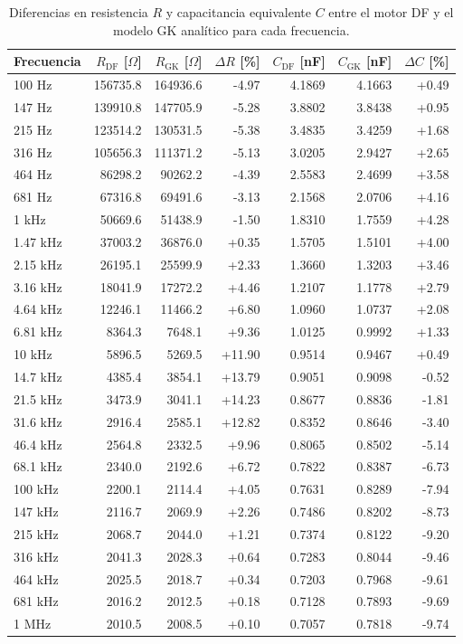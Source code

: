 \begin{table}[ht]
\centering
\caption{Diferencias en resistencia $R$ y capacitancia equivalente $C$ entre el motor DF y el modelo GK analítico para cada frecuencia.}
\label{tab:diff_RC}
\small
\begin{tabular}{lrrrrrr}
\toprule
Frecuencia & $R_{\mathrm{DF}}$ [$\Omega$] & $R_{\mathrm{GK}}$ [$\Omega$] & $\Delta R$ [\%] & $C_{\mathrm{DF}}$ [nF] & $C_{\mathrm{GK}}$ [nF] & $\Delta C$ [\%] \\
\midrule
100 Hz     & 156735.8 & 164936.6 & -4.97 & 4.1869 & 4.1663 & +0.49 \\
147 Hz     & 139910.8 & 147705.9 & -5.28 & 3.8802 & 3.8438 & +0.95 \\
215 Hz     & 123514.2 & 130531.5 & -5.38 & 3.4835 & 3.4259 & +1.68 \\
316 Hz     & 105656.3 & 111371.2 & -5.13 & 3.0205 & 2.9427 & +2.65 \\
464 Hz     & 86298.2 & 90262.2 & -4.39 & 2.5583 & 2.4699 & +3.58 \\
681 Hz     & 67316.8 & 69491.6 & -3.13 & 2.1568 & 2.0706 & +4.16 \\
1 kHz      & 50669.6 & 51438.9 & -1.50 & 1.8310 & 1.7559 & +4.28 \\
1.47 kHz   & 37003.2 & 36876.0 & +0.35 & 1.5705 & 1.5101 & +4.00 \\
2.15 kHz   & 26195.1 & 25599.9 & +2.33 & 1.3660 & 1.3203 & +3.46 \\
3.16 kHz   & 18041.9 & 17272.2 & +4.46 & 1.2107 & 1.1778 & +2.79 \\
4.64 kHz   & 12246.1 & 11466.2 & +6.80 & 1.0960 & 1.0737 & +2.08 \\
6.81 kHz   & 8364.3 & 7648.1 & +9.36 & 1.0125 & 0.9992 & +1.33 \\
10 kHz     & 5896.5 & 5269.5 & +11.90 & 0.9514 & 0.9467 & +0.49 \\
14.7 kHz   & 4385.4 & 3854.1 & +13.79 & 0.9051 & 0.9098 & -0.52 \\
21.5 kHz   & 3473.9 & 3041.1 & +14.23 & 0.8677 & 0.8836 & -1.81 \\
31.6 kHz   & 2916.4 & 2585.1 & +12.82 & 0.8352 & 0.8646 & -3.40 \\
46.4 kHz   & 2564.8 & 2332.5 & +9.96 & 0.8065 & 0.8502 & -5.14 \\
68.1 kHz   & 2340.0 & 2192.6 & +6.72 & 0.7822 & 0.8387 & -6.73 \\
100 kHz    & 2200.1 & 2114.4 & +4.05 & 0.7631 & 0.8289 & -7.94 \\
147 kHz    & 2116.7 & 2069.9 & +2.26 & 0.7486 & 0.8202 & -8.73 \\
215 kHz    & 2068.7 & 2044.0 & +1.21 & 0.7374 & 0.8122 & -9.20 \\
316 kHz    & 2041.3 & 2028.3 & +0.64 & 0.7283 & 0.8044 & -9.46 \\
464 kHz    & 2025.5 & 2018.7 & +0.34 & 0.7203 & 0.7968 & -9.61 \\
681 kHz    & 2016.2 & 2012.5 & +0.18 & 0.7128 & 0.7893 & -9.69 \\
1 MHz      & 2010.5 & 2008.5 & +0.10 & 0.7057 & 0.7818 & -9.74 \\
\bottomrule
\end{tabular}
\end{table}
